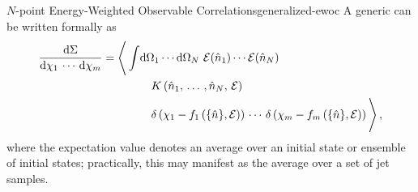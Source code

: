 \begin{definitionbox}{\(N\)-point Energy-Weighted Observable Correlations}{generalized-ewoc}
    A generic  can be written formally as
    \begin{align}
        \frac{\dd\Sigma}{\dd\chi_1\,\cdots\,\dd\chi_m}
        =
        \Bigg\langle
        \int &\dd\Omega_1\cdots\dd\Omega_N
        \,\,
        \mathcal{E}(\hat{n}_1)
        \cdots
        \mathcal{E}(\hat{n}_N)
        \\
        \notag
        &\quad
        K\left(\hat{n}_1,\,\dots\,,\hat{n}_N,\, \mathcal{E}\right)
        \\
        \notag
        &\quad
        \delta\left(\chi_1 - f_1\left(\{\hat{n}\}, \mathcal{E}\right)\right)
        \,
        \cdots
        \,
        \delta\left(\chi_m - f_m\left(\{\hat{n}\}, \mathcal{E}\right)\right)
        \Bigg\rangle
        \,,
    \end{align}
    where the expectation value denotes an average over an initial state or ensemble of initial states;
    practically, this may manifest as the average over a set of jet samples.
\end{definitionbox}

